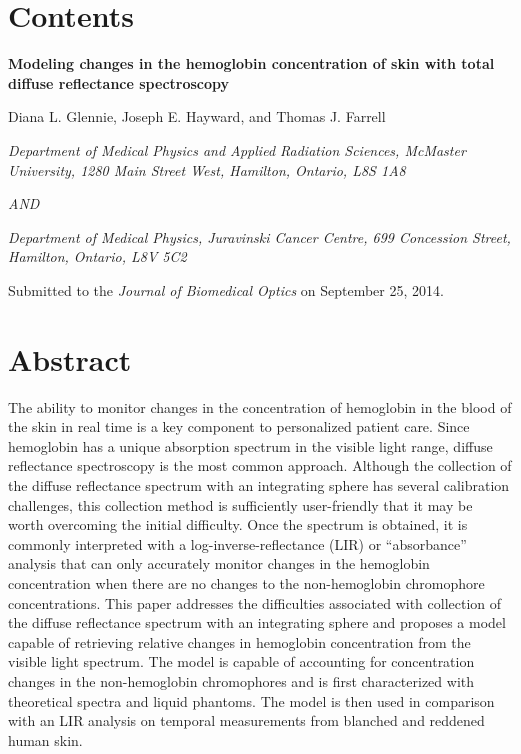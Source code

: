\section*{Contents}

\begin{center}
	
	\textbf{Modeling changes in the hemoglobin concentration of skin with total diffuse reflectance spectroscopy}
	
	Diana L. Glennie, Joseph E. Hayward, and Thomas J. Farrell
	
	\textit{Department of Medical Physics and Applied Radiation Sciences, McMaster University, 1280 Main Street West, Hamilton, Ontario, L8S 1A8}

	\textit{AND}

	\textit{Department of Medical Physics, Juravinski Cancer Centre, 699 Concession Street, Hamilton, Ontario, L8V 5C2}

\end{center}

\noindent Submitted to the \textit{Journal of Biomedical Optics} on September 25, 2014.

\section*{Abstract}
The ability to monitor changes in the concentration of hemoglobin in the blood of the skin in real time is a key component to personalized patient care. Since hemoglobin has a unique absorption spectrum in the visible light range, diffuse reflectance spectroscopy is the most common approach. Although the collection of the diffuse reflectance spectrum with an integrating sphere has several calibration challenges, this collection method is sufficiently user-friendly that it may be worth overcoming the initial difficulty. Once the spectrum is obtained, it is commonly interpreted with a log-inverse-reflectance (LIR) or ``absorbance'' analysis that can only accurately monitor changes in the hemoglobin concentration when there are no changes to the non-hemoglobin chromophore concentrations. This paper addresses the difficulties associated with collection of the diffuse reflectance spectrum with an integrating sphere and proposes a model capable of retrieving relative changes in hemoglobin concentration from the visible light spectrum. The model is capable of accounting for concentration changes in the non-hemoglobin chromophores and is first characterized with theoretical spectra and liquid phantoms. The model is then used in comparison with an LIR analysis on temporal measurements from blanched and reddened human skin.

